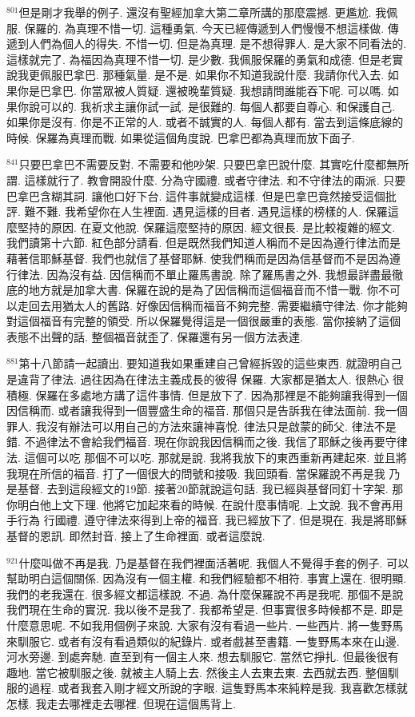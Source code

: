 \documentclass{book}
\begin{document}
$^{801}$但是剛才我舉的例子.
還沒有聖經加拿大第二章所講的那麼震撼.
更尷尬.
我佩服.
保羅的.
為真理不惜一切.
這種勇氣.
今天已經傳遞到人們慢慢不想這樣做.
傳遞到人們為個人的得失.
不惜一切.
但是為真理.
是不想得罪人.
是大家不同看法的.
這樣就完了.
為福因為真理不惜一切.
是少數.
我佩服保羅的勇氣和成德.
但是老實說我更佩服巴拿巴.
那種氣量.
是不是.
如果你不知道我說什麼.
我請你代入去.
如果你是巴拿巴.
你當眾被人質疑.
還被晚輩質疑.
我想請問誰能吞下呢.
可以嗎.
如果你說可以的.
我祈求主讓你試一試.
是很難的.
每個人都要自尊心.
和保護自己.
如果你是沒有.
你是不正常的人.
或者不誠實的人.
每個人都有.
當去到這條底線的時候.
保羅為真理而戰.
如果從這個角度說.
巴拿巴都為真理而放下面子.

$^{841}$只要巴拿巴不需要反對.
不需要和他吵架.
只要巴拿巴說什麼.
其實吃什麼都無所謂.
這樣就行了.
教會開設什麼.
分為守國禮.
或者守律法.
和不守律法的兩派.
只要巴拿巴含糊其詞.
讓他口好下台.
這件事就變成這樣.
但是巴拿巴竟然接受這個批評.
難不難.
我希望你在人生裡面.
遇見這樣的目者.
遇見這樣的榜樣的人.
保羅這麼堅持的原因.
在夏文他說.
保羅這麼堅持的原因.
經文很長.
是比較複雜的經文.
我們讀第十六節.
紅色部分請看.
但是既然我們知道人稱而不是因為遵行律法而是藉著信耶穌基督.
我們也就信了基督耶穌.
使我們稱而是因為信基督而不是因為遵行律法.
因為沒有益.
因信稱而不單止羅馬書說.
除了羅馬書之外.
我想最詳盡最徹底的地方就是加拿大書.
保羅在說的是為了因信稱而這個福音而不惜一戰.
你不可以走回去用猶太人的舊路.
好像因信稱而福音不夠完整.
需要繼續守律法.
你才能夠對這個福音有完整的領受.
所以保羅覺得這是一個很嚴重的表態.
當你接納了這個表態不出聲的話.
整個福音就歪了.
保羅還有另一個方法表達.

$^{881}$第十八節請一起讀出.
要知道我如果重建自己曾經拆毀的這些東西.
就證明自己是違背了律法.
過往因為在律法主義成長的彼得 保羅.
大家都是猶太人.
很熱心 很積極.
保羅在多處地方講了這件事情.
但是放下了.
因為那裡是不能夠讓我得到一個因信稱而.
或者讓我得到一個豐盛生命的福音.
那個只是告訴我在律法面前.
我一個罪人.
我沒有辦法可以用自己的方法來讓神喜悅.
律法只是啟蒙的師父.
律法不是錯.
不過律法不會給我們福音.
現在你說我因信稱而之後.
我信了耶穌之後再要守律法.
這個可以吃 那個不可以吃.
那就是說.
我將我放下的東西重新再建起來.
並且將我現在所信的福音.
打了一個很大的問號和接吸.
我回頭看.
當保羅說不再是我 乃是基督.
去到這段經文的19節.
接著20節就說這句話.
我已經與基督同釘十字架.
那你明白他上文下理.
他將它加起來看的時候.
在說什麼事情呢.
上文說.
我不會再用手行為 行國禮.
遵守律法來得到上帝的福音.
我已經放下了.
但是現在.
我是將耶穌基督的恩訊.
即然封音.
接上了生命裡面.
或者這麼說.

$^{921}$什麼叫做不再是我.
乃是基督在我們裡面活著呢.
我個人不覺得手套的例子.
可以幫助明白這個關係.
因為沒有一個主權.
和我們經驗都不相符.
事實上還在.
很明顯.
我們的老我還在.
很多經文都這樣說.
不過.
為什麼保羅說不再是我呢.
那個不是說我們現在生命的實況.
我以後不是我了.
我都希望是.
但事實很多時候都不是.
即是什麼意思呢.
不如我用個例子來說.
大家有沒有看過一些片.
一些西片.
將一隻野馬來馴服它.
或者有沒有看過類似的紀錄片.
或者戲甚至書籍.
一隻野馬本來在山邊.
河水旁邊.
到處奔馳.
直至到有一個主人來.
想去馴服它.
當然它掙扎.
但最後很有趣地.
當它被馴服之後.
就被主人騎上去.
然後主人去東去東.
去西就去西.
整個馴服的過程.
或者我套入剛才經文所說的字眼.
這隻野馬本來純粹是我.
我喜歡怎樣就怎樣.
我走去哪裡走去哪裡.
但現在這個馬背上.
\end{document}
